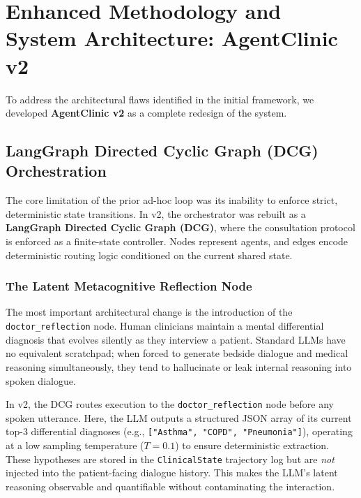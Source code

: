 \chapter{Enhanced Methodology and System Architecture: AgentClinic v2}
\label{Chapter5}

To address the architectural flaws identified in the initial framework, we developed \textbf{AgentClinic v2} as a complete redesign of the system.

\section{LangGraph Directed Cyclic Graph (DCG) Orchestration}

The core limitation of the prior ad-hoc loop was its inability to enforce strict, deterministic state transitions. In v2, the orchestrator was rebuilt as a \textbf{LangGraph Directed Cyclic Graph (DCG)}, where the consultation protocol is enforced as a finite-state controller. Nodes represent agents, and edges encode deterministic routing logic conditioned on the current shared state.

\subsection{The Latent Metacognitive Reflection Node}

The most important architectural change is the introduction of the \texttt{doctor\_reflection} node. Human clinicians maintain a mental differential diagnosis that evolves silently as they interview a patient. Standard LLMs have no equivalent scratchpad; when forced to generate bedside dialogue and medical reasoning simultaneously, they tend to hallucinate or leak internal reasoning into spoken dialogue.

In v2, the DCG routes execution to the \texttt{doctor\_reflection} node before any spoken utterance. Here, the LLM outputs a structured JSON array of its current top-3 differential diagnoses (e.g., \texttt{["Asthma", "COPD", "Pneumonia"]}), operating at a low sampling temperature ($T=0.1$) to ensure deterministic extraction. These hypotheses are stored in the \texttt{ClinicalState} trajectory log but are \textit{not} injected into the patient-facing dialogue history. This makes the LLM's latent reasoning observable and quantifiable without contaminating the interaction.

